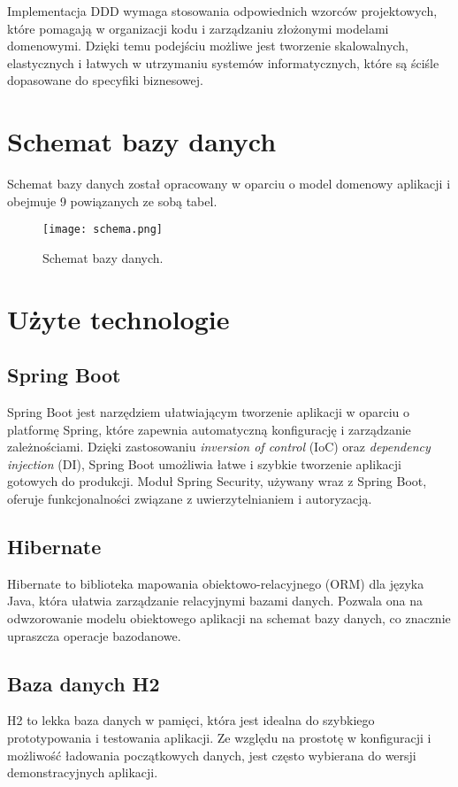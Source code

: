 \documentclass[shortabstract]{iithesis}
\begin{document}
Implementacja DDD wymaga stosowania odpowiednich wzorców projektowych, które pomagają w organizacji kodu i zarządzaniu złożonymi modelami domenowymi. Dzięki temu podejściu możliwe jest tworzenie skalowalnych, elastycznych i łatwych w utrzymaniu systemów informatycznych, które są ściśle dopasowane do specyfiki biznesowej.

\newpage

\section{Schemat bazy danych}
\label{schema}
Schemat bazy danych został opracowany w oparciu o model domenowy aplikacji i obejmuje 9 powiązanych ze sobą tabel.

\begin{figure}[H]
    \centering
    \texttt{[image: schema.png]}
    \caption{Schemat bazy danych.}
    \label{fig:chema}
\end{figure}

\section{Użyte technologie}

\subsection{Spring Boot}
Spring Boot jest narzędziem ułatwiającym tworzenie aplikacji w oparciu o platformę Spring, które zapewnia automatyczną konfigurację i zarządzanie zależnościami. Dzięki zastosowaniu \textit{inversion of control} (IoC) oraz \textit{dependency injection} (DI), Spring Boot umożliwia łatwe i szybkie tworzenie aplikacji gotowych do produkcji. Moduł Spring Security, używany wraz z Spring Boot, oferuje funkcjonalności związane z uwierzytelnianiem i autoryzacją\cite{springboot}.

\subsection{Hibernate}
Hibernate to biblioteka mapowania obiektowo-relacyjnego (ORM) dla języka Java, która ułatwia zarządzanie relacyjnymi bazami danych. Pozwala ona na odwzorowanie modelu obiektowego aplikacji na schemat bazy danych, co znacznie upraszcza operacje bazodanowe\cite{hibernate}.

\subsection{Baza danych H2}
H2 to lekka baza danych w pamięci, która jest idealna do szybkiego prototypowania i testowania aplikacji. Ze względu na prostotę w konfiguracji i możliwość ładowania początkowych danych, jest często wybierana do wersji demonstracyjnych aplikacji\cite{h2database}.
\end{document}
